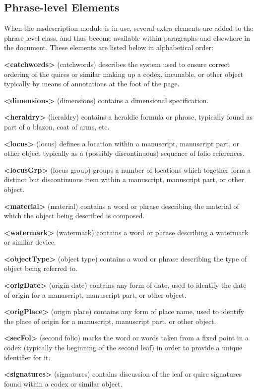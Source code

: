 \subsection[{Phrase-level Elements}]{Phrase-level Elements}\label{msphrase}\par
When the \textsf{msdescription} module is in use, several extra elements are added to the phrase level class, and thus become available within paragraphs and elsewhere in the document. These elements are listed below in alphabetical order: 
\begin{sansreflist}
  
\item [\textbf{<catchwords>}] (catchwords) describes the system used to ensure correct ordering of the quires or similar making up a codex, incunable, or other object typically by means of annotations at the foot of the page.
\item [\textbf{<dimensions>}] (dimensions) contains a dimensional specification.
\item [\textbf{<heraldry>}] (heraldry) contains a heraldic formula or phrase, typically found as part of a blazon, coat of arms, etc. 
\item [\textbf{<locus>}] (locus) defines a location within a manuscript, manuscript part, or other object typically as a (possibly discontinuous) sequence of folio references.
\item [\textbf{<locusGrp>}] (locus group) groups a number of locations which together form a distinct but discontinuous item within a manuscript, manuscript part, or other object.
\item [\textbf{<material>}] (material) contains a word or phrase describing the material of which the object being described is composed.
\item [\textbf{<watermark>}] (watermark) contains a word or phrase describing a watermark or similar device.
\item [\textbf{<objectType>}] (object type) contains a word or phrase describing the type of object being referred to.
\item [\textbf{<origDate>}] (origin date) contains any form of date, used to identify the date of origin for a manuscript, manuscript part, or other object.
\item [\textbf{<origPlace>}] (origin place) contains any form of place name, used to identify the place of origin for a manuscript, manuscript part, or other object.
\item [\textbf{<secFol>}] (second folio) marks the word or words taken from a fixed point in a codex (typically the beginning of the second leaf) in order to provide a unique identifier for it. 
\item [\textbf{<signatures>}] (signatures) contains discussion of the leaf or quire signatures found within a codex or similar object.
\end{sansreflist}
